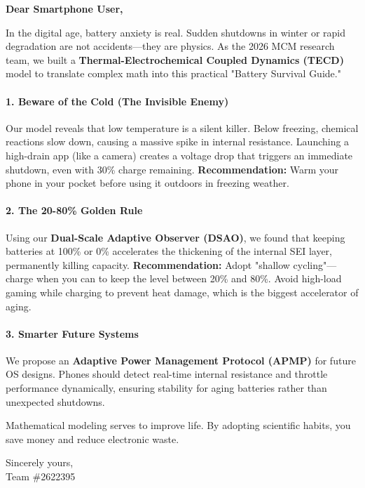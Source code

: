 \documentclass{mcmthesis}
\begin{document}
\textbf{Dear Smartphone User,}

In the digital age, battery anxiety is real. Sudden shutdowns in winter or rapid degradation are not accidents—they are physics. As the 2026 MCM research team, we built a \textbf{Thermal-Electrochemical Coupled Dynamics (TECD)} model to translate complex math into this practical "Battery Survival Guide."

\paragraph{1. Beware of the Cold (The Invisible Enemy)}
Our model reveals that low temperature is a silent killer. Below freezing, chemical reactions slow down, causing a massive spike in internal resistance. Launching a high-drain app (like a camera) creates a voltage drop that triggers an immediate shutdown, even with 30\% charge remaining. 
\textbf{Recommendation:} Warm your phone in your pocket before using it outdoors in freezing weather.

\paragraph{2. The 20-80\% Golden Rule}
Using our \textbf{Dual-Scale Adaptive Observer (DSAO)}, we found that keeping batteries at 100\% or 0\% accelerates the thickening of the internal SEI layer, permanently killing capacity.
\textbf{Recommendation:} Adopt "shallow cycling"—charge when you can to keep the level between 20\% and 80\%. Avoid high-load gaming while charging to prevent heat damage, which is the biggest accelerator of aging.

\paragraph{3. Smarter Future Systems}
We propose an \textbf{Adaptive Power Management Protocol (APMP)} for future OS designs. Phones should detect real-time internal resistance and throttle performance dynamically, ensuring stability for aging batteries rather than unexpected shutdowns.

Mathematical modeling serves to improve life. By adopting scientific habits, you save money and reduce electronic waste.

\vspace{2cm} %
\noindent \hfill %
\begin{minipage}[t]{3cm} %
    Sincerely yours,\\[0.5em] 
    Team \#2622395
\end{minipage}
\end{document}

